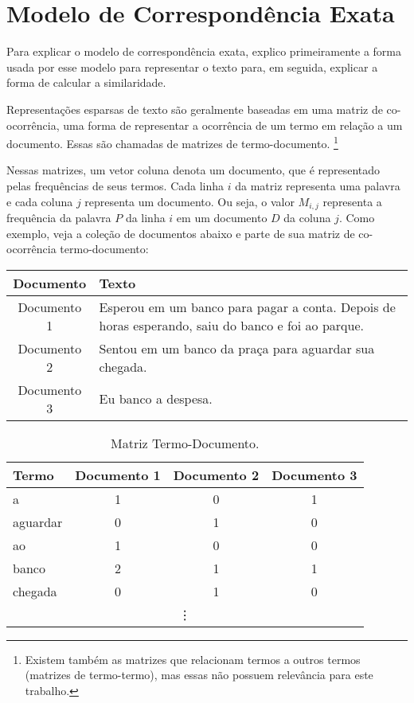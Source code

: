 \documentclass[
	12pt,				%
	openright,			%
	oneside,			%
	a4paper,			%
	english,			%
	french,				%
	spanish,			%
	brazil				%
	]{abntex2}
\begin{document}
\section{Modelo de Correspondência Exata}\label{sec:modelo-de-correspondencia-exata}

Para explicar o modelo de correspondência exata, explico primeiramente a forma usada por esse modelo para representar o texto para, em seguida, explicar a forma de calcular a similaridade.

Representações esparsas de texto são geralmente baseadas em uma matriz de co-ocorrência, uma forma de representar a ocorrência de um
termo em relação a um documento.
Essas são chamadas de matrizes de termo-documento.
\footnote{Existem também as matrizes que relacionam termos a outros termos (matrizes de termo-termo), mas essas não possuem relevância para este trabalho.}
\cite{JurafskyMartin2023}

Nessas matrizes, um vetor coluna denota um documento, que é representado pelas frequências de seus termos.
Cada linha $i$ da matriz representa uma palavra e cada coluna $j$ representa um documento.
Ou seja, o valor $M_{i,j}$ representa a frequência da palavra $P$ da linha $i$ em um documento $D$ da coluna $j$.
Como exemplo, veja a coleção de documentos abaixo e parte de sua matriz de co-ocorrência termo-documento:

\begin{center}
\begin{tabularx}{\textwidth}{|c|X|}
\hline
Documento & Texto \\
\hline
Documento 1 & Esperou em um banco para pagar a conta. Depois de horas esperando, saiu do banco e foi ao parque. \\
\hline
Documento 2 & Sentou em um banco da praça para aguardar sua chegada. \\
\hline
Documento 3 & Eu banco a despesa. \\
\hline
\end{tabularx}
\end{center}


\begin{table}[ht]
\centering
\caption{Matriz Termo-Documento.}
\label{tab:term-doc-matrix}
\begin{tabular}{|l|c|c|c|}
\hline
Termo     & Documento 1 & Documento 2 & Documento 3 \\
\hline
a         & 1           & 0           & 1           \\
\hline
aguardar  & 0           & 1           & 0           \\
\hline
ao        & 1           & 0           & 0           \\
\hline
banco     & 2           & 1           & 1           \\
\hline
chegada   & 0           & 1           & 0           \\
\hline
\multicolumn{4}{c}{\vdots} \\
\end{tabular}
\end{table}
\end{document}
